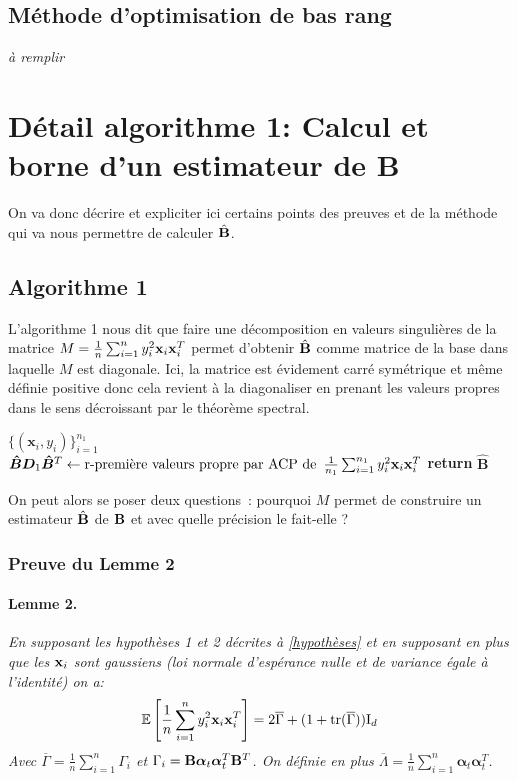 \documentclass[12pt]{article}
\begin{document}
\subsection{Méthode d'optimisation de bas rang}
\textit{à remplir}

\section{Détail algorithme 1: Calcul et borne d'un estimateur de B}\label{part_original_article}
On va donc décrire et expliciter ici certains points des preuves et de la méthode qui va nous permettre de calculer $\hat {\bf B}$.

\subsection{Algorithme 1}\label{algo1}
L'algorithme 1 nous dit que faire une décomposition en valeurs singulières de la matrice $M = \frac{1}{n} \sum_{i=1}^{n}y^2_i{\bf x}_i{\bf x}^T_i$ permet d'obtenir $\hat {\bf B}$ comme matrice de la base dans laquelle $M$ est diagonale. Ici, la matrice est évidement carré symétrique et même définie positive donc cela revient à la diagonaliser en prenant les valeurs propres dans le sens décroissant par le théorème spectral.
\begin{algorithm}
\caption{Estimateur des moments}\label{alg:cap}
\begin{algorithmic}
\renewcommand{\algorithmicrequire}{\textbf{Input: }}
\Require $\{(\textbf{x}_i, y_i)\}^{n_1}_{i = 1}$
\State $\bm{\hat{B}D}_1\bm{\hat{B}}^T \gets \text{r-première valeurs propre par ACP de \,} \frac{1}{n_1} \sum^{n_1}_{i = 1}y^2_i\textbf{x}_i\textbf{x}^T_i$
\State \textbf{return} $\bm{\hat{B}}$
\end{algorithmic}
\end{algorithm}

On peut alors se poser deux questions~: pourquoi $M$ permet de construire un estimateur $\hat {\bf B}$ de ${\bf B}$ et avec quelle précision le fait-elle ?

\subsubsection{Preuve du Lemme 2}\label{lemme2}
\paragraph*{Lemme 2.} \textit{En supposant les hypothèses 1 et 2 décrites à \ref{hypothèses} et en supposant en plus que les ${\bf x}_i$ sont gaussiens (loi normale d'espérance nulle et de variance égale à l'identité) on a:}
$$
\mathbb{E}\left[\frac{1}{n} \sum_{i=1}^{n}y^2_i{\bf x}_i{\bf x}^T_i\right] = 2\overline{\Gamma} + (1+ \text{tr}{(\overline{\Gamma})})\text{I}_d
$$
\textit {Avec $\overline{\Gamma} = \frac{1}{n} \sum_{i=1}^{n} \Gamma_i$ et $\Gamma_i = {\bf B}{\bm \alpha}_{t} {\bm \alpha}^T_{t}{\bf B}^T$.
On définie en plus $\overline{\Lambda} = \frac{1}{n} \sum_{i=1}^{n}{\bm \alpha}_{t} {\bm \alpha}^T_t$.} \\
\end{document}
